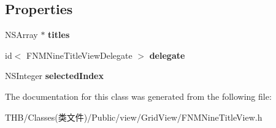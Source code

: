 \subsection*{Properties}
\begin{DoxyCompactItemize}
\item 
\mbox{\label{interface_f_n_m_nine_title_view_a9c359b02638aa5383d2b99b47c160ce7}} 
N\+S\+Array $\ast$ {\bfseries titles}
\item 
\mbox{\label{interface_f_n_m_nine_title_view_a902b2960a1b1697ef62fb7a1705e3743}} 
id$<$ F\+N\+M\+Nine\+Title\+View\+Delegate $>$ {\bfseries delegate}
\item 
\mbox{\label{interface_f_n_m_nine_title_view_a99bddf993ee5a0d68281ea22feee2369}} 
N\+S\+Integer {\bfseries selected\+Index}
\end{DoxyCompactItemize}


The documentation for this class was generated from the following file\+:\begin{DoxyCompactItemize}
\item 
T\+H\+B/\+Classes(类文件)/\+Public/view/\+Grid\+View/F\+N\+M\+Nine\+Title\+View.\+h\end{DoxyCompactItemize}
